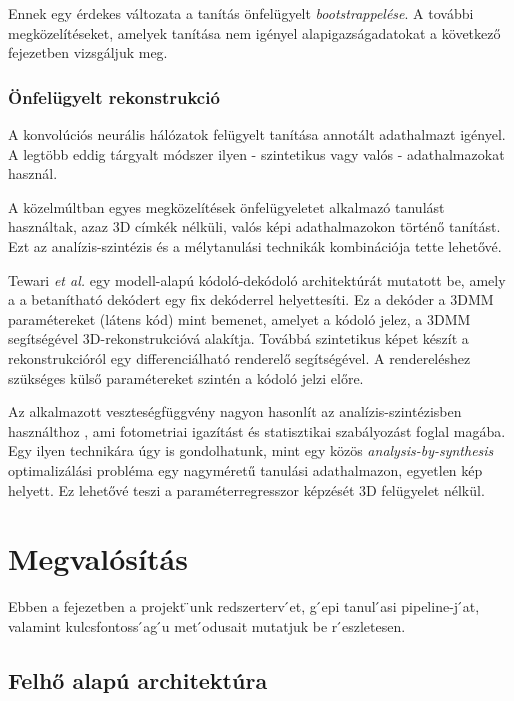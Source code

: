 \documentclass[12pt,a4]{article}
\begin{document}
	Ennek egy érdekes változata
	a tanítás önfelügyelt \textit{bootstrappelése}. A további megközelítéseket, amelyek tanítása nem igényel
	alapigazságadatokat a következő fejezetben vizsgáljuk meg.
	
	\subsubsection{Önfelügyelt rekonstrukció}
	A konvolúciós neurális hálózatok felügyelt tanítása annotált adathalmazt igényel. A legtöbb
	eddig tárgyalt módszer ilyen - szintetikus vagy valós - adathalmazokat használ.
	
	\cite{3dmm}
	A közelmúltban egyes megközelítések önfelügyeletet alkalmazó
	tanulást használtak, azaz 3D címkék nélküli, valós képi adathalmazokon történő tanítást.
	Ezt az analízis-szintézis és a mélytanulási technikák kombinációja tette lehetővé.
	
	
	Tewari \textit{et al.} \cite{tewari} egy modell-alapú kódoló-dekódoló architektúrát mutatott be, amely a
	a betanítható dekódert egy fix dekóderrel helyettesíti. Ez a dekóder a 3DMM paramétereket (látens kód)
	mint bemenet, amelyet a kódoló jelez, a 3DMM segítségével 3D-rekonstrukcióvá alakítja.
	Továbbá szintetikus képet készít a rekonstrukcióról egy differenciálható renderelő segítségével.
	A rendereléshez szükséges külső paramétereket szintén a kódoló jelzi előre. 
	
	
	Az alkalmazott veszteségfüggvény nagyon hasonlít az analízis-szintézisben használthoz \cite{3dmm}, ami fotometriai igazítást és statisztikai szabályozást foglal magába. Egy ilyen technikára úgy is gondolhatunk, mint egy közös
	\textit{analysis-by-synthesis} optimalizálási probléma egy nagyméretű tanulási
	adathalmazon, egyetlen kép helyett. Ez lehetővé teszi a paraméterregresszor képzését 3D felügyelet nélkül.
	
	\newpage
	\section{Megvalósítás}
	
	Ebben a fejezetben a projekt ̈unk redszerterv ́et, g ́epi tanul ́asi pipeline-j ́at,
	valamint kulcsfontoss ́ag ́u met ́odusait mutatjuk be r ́eszletesen.
	
	\subsection{Felhő alapú architektúra}
	
\end{document}
